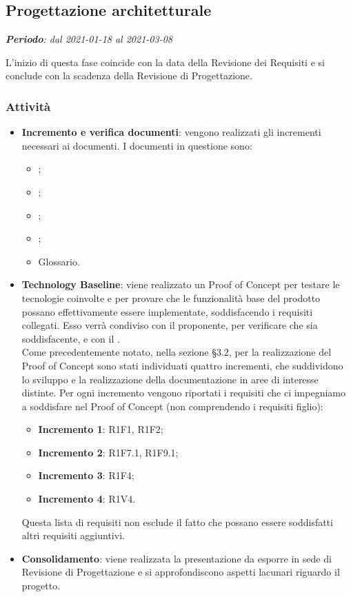 \subsection{Progettazione architetturale}
\textit{\textbf{Periodo}: dal 2021-01-18 al 2021-03-08}

L'inizio di questa fase coincide con la data della Revisione dei Requisiti e si conclude con la scadenza della Revisione di Progettazione.

\subsubsection{Attività}

\begin{itemize}
\item \textbf{Incremento e verifica documenti}: vengono realizzati gli incrementi necessari ai documenti. I documenti in questione sono:
\begin{itemize}
\item \NdP{};
\item \AdR{};
\item \PdQ{};
\item \PdP{};
\item Glossario.
\end{itemize}
\item \textbf{Technology Baseline}: viene realizzato un Proof of Concept per testare le tecnologie coinvolte e per provare che le funzionalità base del prodotto possano effettivamente essere implementate, soddisfacendo i requisiti collegati. Esso verrà condiviso con il proponente, per verificare che sia soddisfacente, e con il \CR{}.\\ Come precedentemente notato, nella sezione \S{3.2}, per la realizzazione del Proof of Concept sono stati individuati quattro incrementi, che suddividono lo sviluppo e la realizzazione della documentazione in aree di interesse distinte. Per ogni incremento vengono riportati i requisiti che ci impegniamo a soddisfare nel Proof of Concept (non comprendendo i requisiti figlio):
\begin{itemize}
\item \textbf{Incremento 1}: R1F1, R1F2;
\item \textbf{Incremento 2}: R1F7.1, R1F9.1;
\item \textbf{Incremento 3}: R1F4;
\item \textbf{Incremento 4}: R1V4.
\end{itemize}
Questa lista di requisiti non esclude il fatto che possano essere soddisfatti altri requisiti aggiuntivi.
\item \textbf{Consolidamento}: viene realizzata la presentazione da esporre in sede di Revisione di Progettazione e si approfondiscono aspetti lacunari riguardo il progetto.
\end{itemize}


